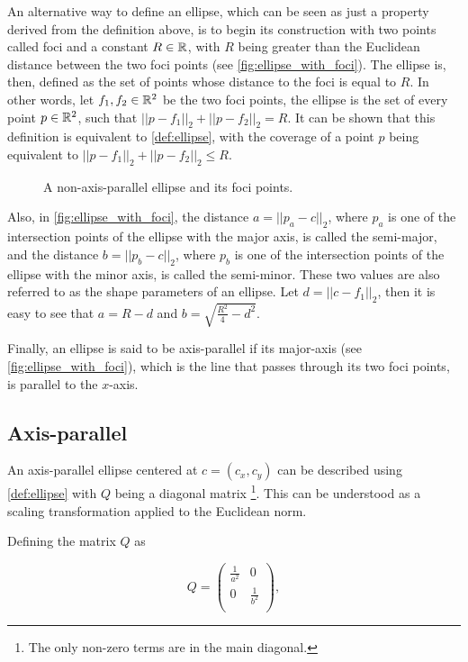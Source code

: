 An alternative way to define an ellipse, which can be seen as just a property derived from the definition above, is to begin its construction with two points called foci and a constant $R \in \mathbb{R}$, with $R$ being greater than the Euclidean distance between the two foci points (see \autoref{fig:ellipse_with_foci}). The ellipse is, then, defined as the set of points whose distance to the foci is equal to $R$. In other words, let $f_1, f_2 \in \mathbb{R}^2$ be the two foci points, the ellipse is the set of every point $p \in \mathbb{R}^2$, such that $||p-f_1||_2 + ||p-f_2||_2 = R$. It can be shown that this definition is equivalent to \autoref{def:ellipse}, with the coverage of a point $p$ being equivalent to $||p-f_1||_2 + ||p-f_2||_2 \le R$.

\begin{figure}[H]
    \centering
    
    \caption{A non-axis-parallel ellipse and its foci points.}
    
    \fautor
    \label{fig:ellipse_with_foci}
\end{figure}

Also, in \autoref{fig:ellipse_with_foci}, the distance $a = ||p_a - c||_2$, where $p_a$ is one of the intersection points of the ellipse with the major axis, is called the semi-major, and the distance $b = ||p_b-c||_2$, where $p_b$ is one of the intersection points of the ellipse with the minor axis, is called the semi-minor. These two values are also referred to as the shape parameters of an ellipse. Let $d = ||c-f_1||_2$, then it is easy to see that $a = R - d$ and $b = \sqrt{\frac{R^2}{4} - d^2}$.

Finally, an ellipse is said to be axis-parallel if its major-axis (see \autoref{fig:ellipse_with_foci}), which is the line that passes through its two foci points, is parallel to the $x$-axis.

\subsection{Axis-parallel}

An axis-parallel ellipse centered at $c = (c_x,c_y)$ can be described using \autoref{def:ellipse} with $Q$ being a diagonal matrix \footnote{The only non-zero terms are in the main diagonal.}. This can be understood as a scaling transformation applied to the Euclidean norm.

Defining the matrix $Q$ as

\[
Q=
\left( {\begin{array}{cc}
    \frac{1}{a^2} & 0 \\
    0 & \frac{1}{b^2} \\
    \end{array} } \right),
\]

